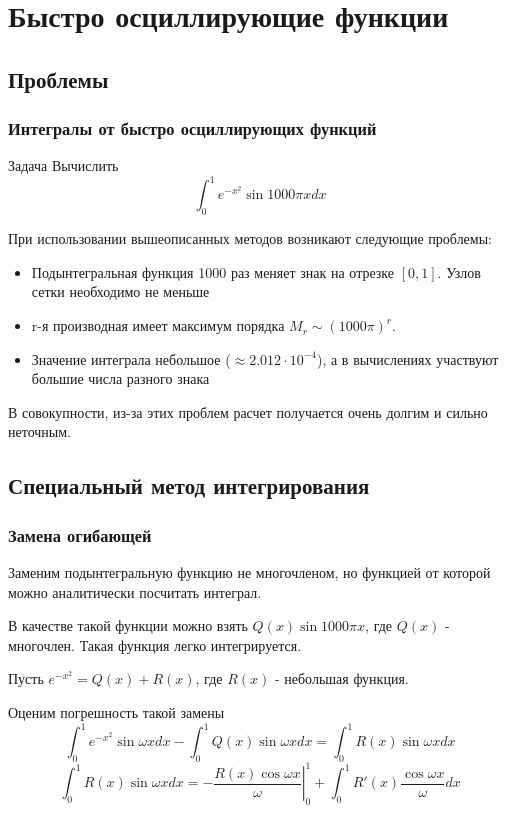 \documentclass[aspectratio=169,unicode]{beamer}
\begin{document}
\section{Быстро осциллирующие функции}
\subsection{Проблемы}
\begin{frame}
\frametitle{Интегралы от быстро осциллирующих функций}
	\begin{block}{Задача}
		Вычислить
		\[
		\int_0^1 e^{-x^2} \sin 1000\pi x dx
		\]
	\end{block}
	\pause

	При использовании вышеописанных методов возникают следующие проблемы:
	\begin{itemize}
		\item Подынтегральная функция 1000 раз меняет знак на отрезке $[0,1]$. Узлов сетки необходимо не меньше
		\item r-я производная имеет максимум порядка $M_r \sim (1000\pi)^r$.
		\item Значение интеграла небольшое ($\approx 2.012\cdot10^{-4}$), а в вычислениях участвуют большие числа разного знака
	\end{itemize}

	В совокупности, из-за этих проблем расчет получается очень долгим и сильно неточным.
\end{frame}

\subsection{Специальный метод интегрирования}
\begin{frame}
\frametitle{Замена огибающей}
	Заменим подынтегральную функцию не многочленом, но функцией от которой можно аналитически посчитать
	интеграл.
	\pause

	В качестве такой функции можно взять $Q(x) \sin 1000\pi x$, где $Q(x)$ - многочлен.
	Такая функция легко интегрируется.
	\pause

	Пусть $e^{-x^2} = Q(x) + R(x)$, где $R(x)$ - небольшая функция.

	Оценим погрешность такой замены
	$$
	\int_0^1 e^{-x^2} \sin \omega x dx - \int_0^1 Q(x) \sin \omega x dx =
	\int_0^1 R(x) \sin \omega x dx
	$$
	$$
	\int_0^1 R(x) \sin \omega x dx = - \left.\frac{R(x) \cos \omega x}{\omega} \right|_0^1 +
	\int_0^1 R'(x) \frac{\cos \omega x}{\omega} dx
	$$
\end{frame}
\end{document}
